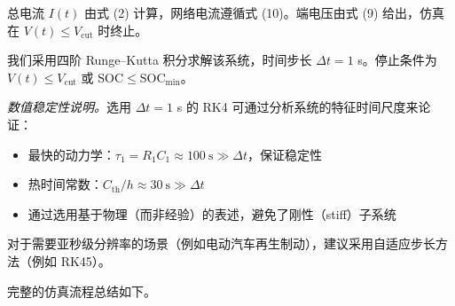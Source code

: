 \documentclass[11pt,a4paper]{ctexart}
\begin{document}
总电流 $I(t)$ 由式 (2) 计算，网络电流遵循式 (10)。端电压由式 (9) 给出，仿真在 $V(t)\le V_{\mathrm{cut}}$ 时终止。

我们采用四阶 Runge--Kutta 积分求解该系统，时间步长 $\Delta t = 1$ s。停止条件为 $V(t)\le V_{\mathrm{cut}}$ 或 $\mathrm{SOC}\le \mathrm{SOC}_{\min}$。

\textit{数值稳定性说明。}选用 $\Delta t = 1$ s 的 RK4 可通过分析系统的特征时间尺度来论证：
\begin{itemize}[leftmargin=2em]
\item 最快的动力学：$\tau_1 = R_1 C_1 \approx 100\ \mathrm{s} \gg \Delta t$，保证稳定性
\item 热时间常数：$C_{\mathrm{th}}/h \approx 30\ \mathrm{s} \gg \Delta t$
\item 通过选用基于物理（而非经验）的表述，避免了刚性（stiff）子系统
\end{itemize}
对于需要亚秒级分辨率的场景（例如电动汽车再生制动），建议采用自适应步长方法（例如 RK45）。

完整的仿真流程总结如下。
\end{document}
